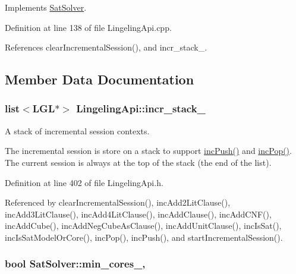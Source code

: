 Implements \hyperlink{classSatSolver_a74603f84c3f2383a5fc44d5a8093cbea}{Sat\-Solver}.



Definition at line 138 of file Lingeling\-Api.\-cpp.



References clear\-Incremental\-Session(), and incr\-\_\-stack\-\_\-.



\subsection{Member Data Documentation}
\hypertarget{classLingelingApi_af9b5703f6611337668def5aaf6be465a}{
\subsubsection[{incr\-\_\-stack\-\_\-}]{\setlength{\rightskip}{0pt plus 5cm}list$<$L\-G\-L$\ast$$>$ Lingeling\-Api\-::incr\-\_\-stack\-\_\-\hspace{0.3cm}{\ttfamily [protected]}}}\label{classLingelingApi_af9b5703f6611337668def5aaf6be465a}


A stack of incremental session contexts. 

The incremental session is store on a stack to support \hyperlink{classLingelingApi_a91c858d2a36a4fbe580909a793802a76}{inc\-Push()} and \hyperlink{classLingelingApi_afe43e1243338a332803fff470eedbf7a}{inc\-Pop()}. The current session is always at the top of the stack (the end of the list). 

Definition at line 402 of file Lingeling\-Api.\-h.



Referenced by clear\-Incremental\-Session(), inc\-Add2\-Lit\-Clause(), inc\-Add3\-Lit\-Clause(), inc\-Add4\-Lit\-Clause(), inc\-Add\-Clause(), inc\-Add\-C\-N\-F(), inc\-Add\-Cube(), inc\-Add\-Neg\-Cube\-As\-Clause(), inc\-Add\-Unit\-Clause(), inc\-Is\-Sat(), inc\-Is\-Sat\-Model\-Or\-Core(), inc\-Pop(), inc\-Push(), and start\-Incremental\-Session().

\hypertarget{classSatSolver_adfeecebfd09606c82b5c57cfe5aad813}{
\subsubsection[{min\-\_\-cores\-\_\-}]{\setlength{\rightskip}{0pt plus 5cm}bool Sat\-Solver\-::min\-\_\-cores\-\_\-\hspace{0.3cm}{\ttfamily [protected]}, {\ttfamily [inherited]}}}\label{classSatSolver_adfeecebfd09606c82b5c57cfe5aad813}


